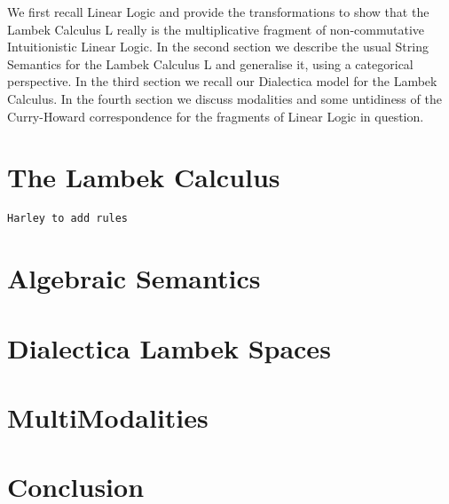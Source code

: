\documentclass{article}
\begin{document}
We first recall Linear Logic and provide the transformations to show that the Lambek Calculus \textsf{L} really is the multiplicative fragment of non-commutative Intuitionistic Linear Logic. 
In the second section we describe the usual String Semantics for the Lambek Calculus \textsf{L} and generalise it, using a categorical perspective. 
In the third section we recall our Dialectica model for the Lambek Calculus. 
In the fourth section we discuss modalities and some untidiness of the Curry-Howard correspondence for the fragments of Linear Logic in question.



\section{The Lambek Calculus}
\texttt{Harley to add rules}

\section{Algebraic Semantics}

\section{Dialectica Lambek Spaces}

\section{MultiModalities}
\section{Conclusion}


\nocite{*} %


\end{document}
